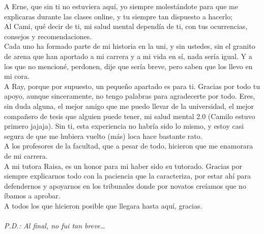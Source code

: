 A Erne, que sin ti no estuviera aquí, yo siempre molestándote para que me explicaras durante las clases online, y tu siempre tan dispuesto a hacerlo;\\
Al Cami, qué decir de ti, mi salud mental dependía de ti, con tus ocurrencias, consejos y recomendaciones. \\
Cada uno ha formado parte de mi historia en la uni, y sin ustedes, sin el granito de arena que han aportado a mi carrera y a mi vida en sí, nada sería igual. Y a los que no mencioné, perdonen, dije que sería breve, pero saben que los llevo en mi cora. \\
A Ray, porque por supuesto, un pequeño apartado es para ti. Gracias por todo tu apoyo, aunque sinceramente, no tengo palabras para agradecerte por todo. Eres, sin duda alguna, el mejor amigo que me puedo llevar de la universidad, el mejor compañero de tesis que alguien puede tener, mi salud mental 2.0 (Camilo estuvo primero jajaja). Sin ti, esta experiencia no habría sido lo mismo, y estoy casi segura de que me hubiera vuelto (más) loca hace bastante rato. \\
A los profesores de la facultad, que a pesar de todo, hicieron que me enamorara de mi carrera. \\
A mi tutora Raisa, es un honor para mi haber sido su tutorado. Gracias por siempre explicarnos todo con la paciencia que la caracteriza, por estar ahí para defendernos y apoyarnos en los tribunales donde por novatos creíamos que no íbamos a aprobar. \\
A todos los que hicieron posible que llegara hasta aquí, gracias. \\ \\
\textit{P.D.: Al final, no fui tan breve…}
